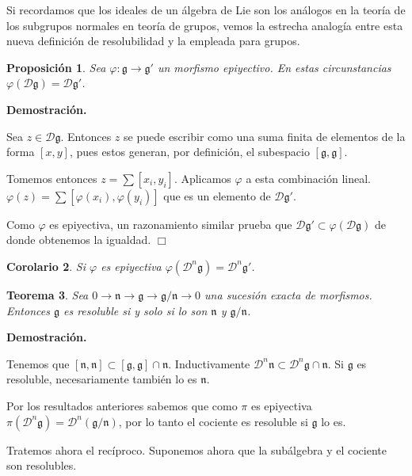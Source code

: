 \documentclass[a4paper,draft,12pt]{scrartcl}
\newtheorem{teo}{Teorema}[section]%
\newtheorem{propo}[teo]{Proposición}%
\newtheorem{cor}[teo]{Corolario}%
\newcommand{\dem}{\noindent \textbf{Demostración. }\vspace{0.3 cm}}%
\newcommand{\g}{\mathfrak{g}}%
\newcommand{\fin}{ $\Box $ \vspace{0.4 cm}}
\newcommand{\D}{\mathcal{D}}%
\begin{document}
Si recordamos que los ideales de un álgebra de Lie son los análogos en la teoría de los subgrupos normales en teoría de grupos, vemos la estrecha analogía entre esta nueva definición de resolubilidad y la empleada para grupos.


\begin{propo}

Sea $\varphi: \g \rightarrow \g'$ un morfismo epiyectivo.  En estas circunstancias $\varphi(\D\g)=\D\g'$.

\end{propo}


\dem

Sea $z \in \D\g$.  Entonces $z$ se puede escribir como una suma finita de elementos de la forma $[x,y]$, pues estos generan, por definición, el subespacio $[\g,\g]$.

Tomemos entonces $z = \sum [x_i,y_i]$.  Aplicamos $\varphi$ a esta combinación lineal. $\varphi(z) = \sum [\varphi(x_i),\varphi(y_i)]$ que es un elemento de $\D \g'$.

Como $\varphi$ es epiyectiva, un razonamiento similar prueba que $\D\g' \subset \varphi(\D\g)$ de donde obtenemos la igualdad.  \fin

\begin{cor}

Si $\varphi$ es epiyectiva $\varphi(\D^n\g) = \D^n\g'$.

\end{cor}

\begin{teo}

Sea $0 \rightarrow \mathfrak{n} \rightarrow \g \rightarrow \g/\mathfrak{n}\rightarrow 0 $ una sucesión exacta de morfismos.  Entonces $\g$ es resoluble si y solo si lo son $\mathfrak{n}$ y $\g/\mathfrak{n}$.

\end{teo}


\dem

Tenemos que $[\mathfrak{n},\mathfrak{n}]\subset [\g,\g]\cap \mathfrak{n}$. Inductivamente $\D^n\mathfrak{n}\subset \D^n \g \cap \mathfrak{n}$.  Si $\g$ es resoluble, necesariamente  también lo es $\mathfrak{n}$.

Por los resultados anteriores sabemos que como $\pi$ es epiyectiva $\pi(\D^n\g) = \D^n(\g/\mathfrak{n})$, por lo tanto el cociente es resoluble si $\g$ lo es.

\bigskip

Tratemos ahora el recíproco.  Suponemos ahora que la subálgebra y el cociente son resolubles.
\end{document}
